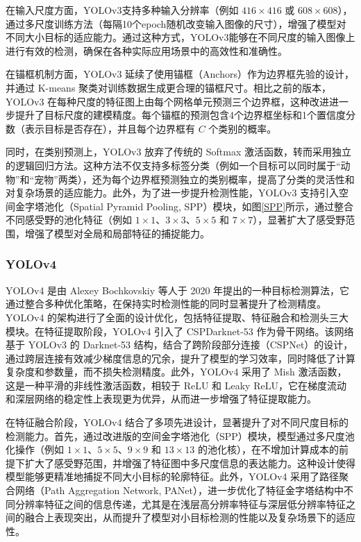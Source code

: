 \documentclass[11pt,twocolumn]{ctexart}
\begin{document}
在输入尺度方面，YOLOv3支持多种输入分辨率（例如 $416 \times 416$ 或 $608 \times 608$），通过多尺度训练方法（每隔10个epoch随机改变输入图像的尺寸），增强了模型对不同大小目标的适应能力。通过这种方式，YOLOv3能够在不同尺度的输入图像上进行有效的检测，确保在各种实际应用场景中的高效性和准确性。

在锚框机制方面，YOLOv3 延续了使用锚框（Anchors）作为边界框先验的设计，并通过 K-means 聚类对训练数据生成更合理的锚框尺寸。相比之前的版本，YOLOv3 在每种尺度的特征图上由每个网格单元预测三个边界框，这种改进进一步提升了目标尺度的建模精度。每个锚框的预测包含4个边界框坐标和1个置信度分数（表示目标是否存在），并且每个边界框有 $C$ 个类别的概率。

同时，在类别预测上，YOLOv3 放弃了传统的 Softmax 激活函数，转而采用独立的逻辑回归方法。这种方法不仅支持多标签分类（例如一个目标可以同时属于“动物”和“宠物”两类），还为每个边界框预测独立的类别概率，提高了分类的灵活性和对复杂场景的适应能力。此外，为了进一步提升检测性能，YOLOv3 支持引入空间金字塔池化（Spatial Pyramid Pooling, SPP）\cite{he2015spatial}模块，如图\ref{SPP}所示，通过整合不同感受野的池化特征（例如 $1\times1$、$3\times3$、$5\times5$ 和 $7\times7$），显著扩大了感受野范围，增强了模型对全局和局部特征的捕捉能力。



\subsubsection{YOLOv4}
YOLOv4\cite{bochkovskiy2020yolov4} 是由 Alexey Bochkovskiy 等人于 2020 年提出的一种目标检测算法，它通过整合多种优化策略，在保持实时检测性能的同时显著提升了检测精度。YOLOv4 的架构进行了全面的设计优化，包括特征提取、特征融合和检测头三大模块。在特征提取阶段，YOLOv4 引入了 CSPDarknet-53 作为骨干网络。该网络基于 YOLOv3 的 Darknet-53 结构，结合了跨阶段部分连接（CSPNet）的设计，通过跨层连接有效减少梯度信息的冗余，提升了模型的学习效率，同时降低了计算复杂度和参数量，而不损失检测精度。此外，YOLOv4 采用了 Mish 激活函数，这是一种平滑的非线性激活函数，相较于 ReLU 和 Leaky ReLU，它在梯度流动和深层网络的稳定性上表现更为优异，从而进一步增强了特征提取能力。

在特征融合阶段，YOLOv4 结合了多项先进设计，显著提升了对不同尺度目标的检测能力。首先，通过改进版的空间金字塔池化（SPP）模块，模型通过多尺度池化操作（例如 $1\times1$、$5\times5$、$9\times9$ 和 $13\times13$ 的池化核），在不增加计算成本的前提下扩大了感受野范围，并增强了特征图中多尺度信息的表达能力。这种设计使得模型能够更精准地捕捉不同大小目标的轮廓特征。此外，YOLOv4 采用了路径聚合网络（Path Aggregation Network, PANet）\cite{liu2018path}，进一步优化了特征金字塔结构中不同分辨率特征之间的信息传递，尤其是在浅层高分辨率特征与深层低分辨率特征之间的融合上表现突出，从而提升了模型对小目标检测的性能以及复杂场景下的适应性。
\end{document}
